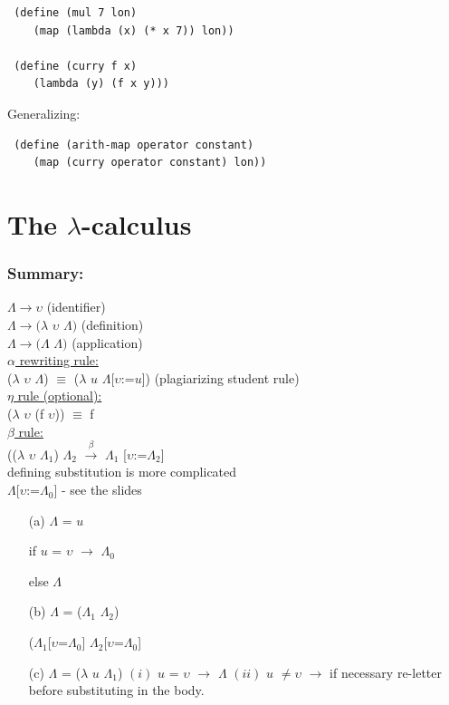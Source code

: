 \documentclass{article}
\begin{document}
\begin{flushleft}
\begin{flushleft}
\begin{verbatim}
 (define (mul 7 lon)
    (map (lambda (x) (* x 7)) lon))
    
 (define (curry f x)
    (lambda (y) (f x y)))
\end{verbatim}
Generalizing:
\begin{verbatim}
 (define (arith-map operator constant)
    (map (curry operator constant) lon))
\end{verbatim}
\end{flushleft}
\section*{The $\lambda$-calculus}
\subsubsection*{Summary:}
\begin{flushleft}
$\Lambda\rightarrow\upsilon$ (identifier) \\ 
$\Lambda\rightarrow(\lambda$ $\upsilon$ $\Lambda)$ (definition) \\
$\Lambda\rightarrow(\Lambda$ $\Lambda)$ (application) \\
\bigskip
\underline{$\alpha$ rewriting rule:}\\
($\lambda$ $\upsilon$ $\Lambda$) $\equiv$ ($\lambda$ $\mathit{u}$ $\Lambda$[$\upsilon$:=$\mathit{u}$]) (plagiarizing student rule)\\
\bigskip
\underline{$\eta$ rule (optional):}\\
($\lambda$ $\upsilon$ (f $\upsilon$)) $\equiv$ f\\
\bigskip
\underline{$\beta$ rule:}\\
(($\lambda$ $\upsilon$ ${\Lambda}_{1}$) ${\Lambda}_{2}$ $\xrightarrow{\beta}$ ${\Lambda}_{1}$ [$\upsilon$:=${\Lambda}_{2}$]\\
\bigskip
defining substitution is more complicated\\
$\Lambda$[$\upsilon$:=${\Lambda}_{0}$] - see the slides \\
\begin{itemize}
 \item[(a)] $\Lambda$ = $\mathit{u}$
 \item[] if $\mathit{u}$ = $\upsilon$ $\rightarrow$ ${\Lambda}_{0}$ 
 \item[] else $\Lambda$
 \item[(b)] $\Lambda$ = (${\Lambda}_{1}$ ${\Lambda}_{2}$)
 \item[] (${\Lambda}_{1}$[$\upsilon$=${\Lambda}_{0}$] ${\Lambda}_{2}$[$\upsilon$=${\Lambda}_{0}$]
 \item[(c)] $\Lambda$ = ($\lambda$ $\mathit{u}$ ${\Lambda}_{1}$)
 \subitem$\mathit{(i)}$ $\mathit{u}$ = $\upsilon$ $\rightarrow$ $\Lambda$
 \subitem$\mathit{(ii)}$ $\mathit{u}$ $\neq\upsilon$ $\rightarrow$ if necessary re-letter before substituting in the body.
\end{itemize}
\end{flushleft}
\pagebreak

\end{flushleft}
\end{document}
